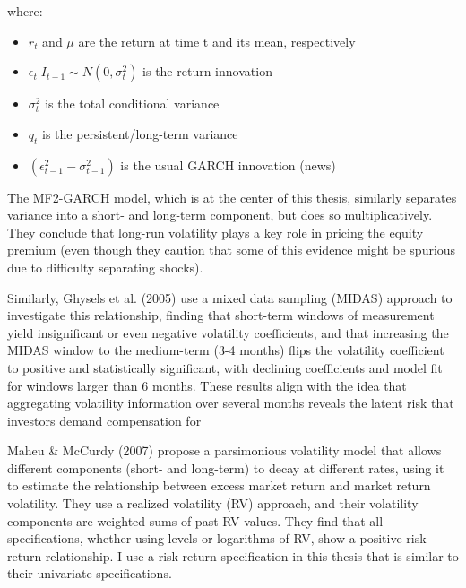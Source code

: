 \documentclass[12pt]{article}
\begin{document}
\noindent where:
\begin{itemize}
\item $r_t$ and $\mu$ are the return at time t and its mean, respectively
\item $\epsilon_t | I_{t-1} \sim N(0,\sigma_t^2)$ is the return innovation
\item $\sigma_t^2$ is the total conditional variance
\item $q_t$ is the persistent/long-term variance
\item $(\epsilon_{t-1}^2-\sigma_{t-1}^2)$ is the usual GARCH innovation (news)
\end{itemize}
The MF2-GARCH model, which is at the center of this thesis, similarly separates variance into a short- and long-term component, but does so multiplicatively. They conclude that long-run volatility plays a key role in pricing the equity premium (even though they caution that some of this evidence might be spurious due to difficulty separating shocks).\par
Similarly, Ghysels et al. (2005) use a mixed data sampling (MIDAS) approach to investigate this relationship, finding that short-term windows of measurement yield insignificant or even negative volatility coefficients, and that increasing the MIDAS window to the medium-term (3-4 months) flips the volatility coefficient to positive and statistically significant, with declining coefficients and model fit for windows larger than 6 months. These results align with the idea that aggregating volatility information over several months reveals the latent risk that investors demand compensation for\par
Maheu \& McCurdy (2007) propose a parsimonious volatility model that allows different components (short- and long-term) to decay at different rates, using it to estimate the relationship between excess market return and market return volatility. They use a realized volatility (RV) approach, and their volatility components are weighted sums of past RV values. They find that all specifications, whether using levels or logarithms of RV,  show a positive risk-return relationship. I use a risk-return specification in this thesis that is similar to their univariate specifications. \par
\end{document}
